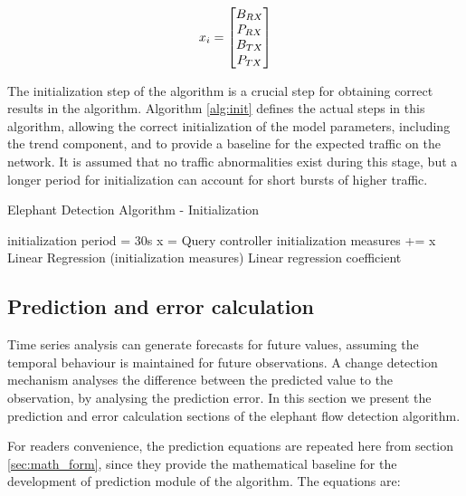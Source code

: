 \begin{equation}
    \centering
    x_i = 
    \begin{bmatrix}
    B_{RX}\\
    P_{RX}\\
    B_{TX}\\
    P_{TX}\\
    \end{bmatrix}
    \label{mat:port_stats}
\end {equation}

The initialization step of the algorithm is a crucial step for obtaining correct results in the algorithm. Algorithm \ref{alg:init} defines the actual steps in this
algorithm, allowing the correct initialization of the model parameters, including the trend component, and to provide a baseline for the expected traffic on the
network. It is assumed that no traffic abnormalities exist during this stage, but a longer period for initialization can account for short bursts of higher traffic.

\begin{algorithm}[H]
    \caption{Elephant Detection Algorithm - Initialization} \label{alg:init}
    \begin{algorithmic}[1]
            \State initialization period = 30s
                \State x = Query controller
                \State initialization measures += x
            \EndWhile
            \State Linear Regression (initialization measures)
        \State \Return Linear regression coefficient
    \end{algorithmic}
\end{algorithm}


\subsection{Prediction and error calculation}

Time series analysis can generate forecasts for future values, assuming the temporal behaviour is maintained for future observations. A change detection mechanism
analyses the difference between the predicted value to the observation, by analysing the prediction error. In this section we present the prediction and error
calculation sections of the elephant flow detection algorithm.

\par For readers convenience, the prediction equations are repeated here from section \ref{sec:math_form}, since they provide the mathematical baseline for the 
development of prediction module of the algorithm. The equations are:

